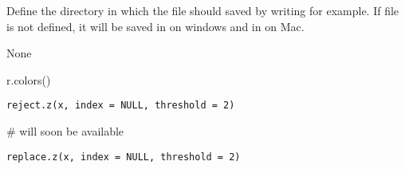 \documentclass[a4paper]{book}
\begin{document}
%
\begin{Details}\relax
Define the directory in which the file should saved by writing  for example.
If file is not defined, it will be saved in  on windows and in  on Mac.
\end{Details}
%
\begin{Value}
None
\end{Value}
%
\begin{Examples}
\begin{ExampleCode}
r.colors()
\end{ExampleCode}
\end{Examples}
\newpage
{}
%
\begin{Usage}
\begin{verbatim}
reject.z(x, index = NULL, threshold = 2)
\end{verbatim}
\end{Usage}
%
\begin{Arguments}
\begin{ldescription}
\item[\code{x}] 


\item[\code{index}] 


\item[\code{threshold}] 


\end{ldescription}
\end{Arguments}
%
\begin{Examples}
\begin{ExampleCode}
# will soon be available
\end{ExampleCode}
\end{Examples}
\newpage
{}
%
\begin{Usage}
\begin{verbatim}
replace.z(x, index = NULL, threshold = 2)
\end{verbatim}
\end{Usage}
%
\begin{Arguments}
\begin{ldescription}
\item[\code{x}] 


\item[\code{index}] 


\item[\code{threshold}] 


\end{ldescription}
\end{Arguments}
\end{document}
